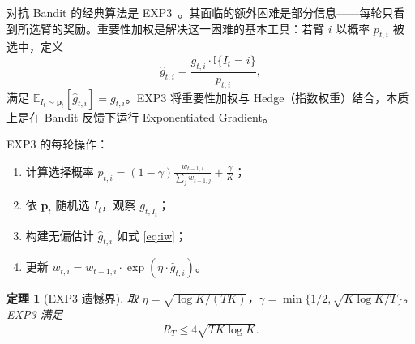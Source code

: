 \documentclass[UTF8,a4paper,11pt,zihao=5]{ctexart}
\newtheorem{theorem}{定理}[section]
\newcommand{\E}{\mathbb{E}}
\newcommand{\ind}{\mathbb{I}}
\newcommand{\regret}[1]{R_{#1}}
\begin{document}
对抗 Bandit 的经典算法是 EXP3~\cite{auer2002b}。其面临的额外困难是部分信息——每轮只看到所选臂的奖励。重要性加权是解决这一困难的基本工具：若臂 $i$ 以概率 $p_{t,i}$ 被选中，定义
\begin{equation}\label{eq:iw}
    \hat{g}_{t,i} = \frac{g_{t,i} \cdot \ind\{I_t = i\}}{p_{t,i}},
\end{equation}
满足 $\E_{I_t \sim \bm{p}_t}[\hat{g}_{t,i}] = g_{t,i}$。EXP3 将重要性加权与 Hedge（指数权重）结合，本质上是在 Bandit 反馈下运行 Exponentiated Gradient。

EXP3 的每轮操作：
\begin{enumerate}[label=(\arabic*), leftmargin=1.8cm]
    \item 计算选择概率 $p_{t,i} = (1-\gamma) \frac{w_{t-1,i}}{\sum_j w_{t-1,j}} + \frac{\gamma}{K}$；
    \item 依 $\bm{p}_t$ 随机选 $I_t$，观察 $g_{t, I_t}$；
    \item 构建无偏估计 $\hat{g}_{t,i}$ 如式 \eqref{eq:iw}；
    \item 更新 $w_{t,i} = w_{t-1,i} \cdot \exp(\eta \cdot \hat{g}_{t,i})$。
\end{enumerate}

\begin{theorem}[EXP3 遗憾界]\label{thm:exp3}
取 $\eta = \sqrt{\log K / (TK)}$，$\gamma = \min\{1/2, \sqrt{K \log K / T}\}$。EXP3 满足
\begin{equation}
    \regret{T} \leq 4\sqrt{T K \log K}.
\end{equation}
\end{theorem}
\end{document}

